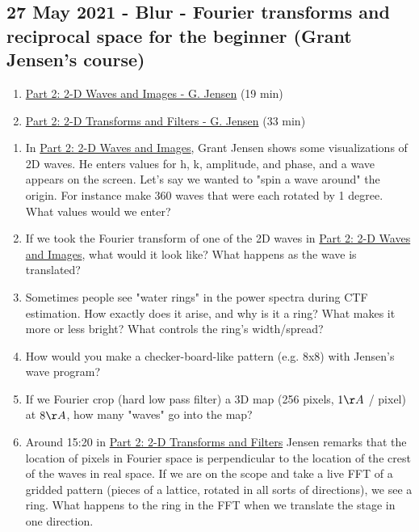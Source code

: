 \documentclass[11pt, oneside]{article}   	%
\begin{document}
\subsection{27 May 2021 - Blur - Fourier transforms and reciprocal space for the beginner (Grant Jensen's course)}
\begin{enumerate}
	\item \href{https://youtu.be/nyk75ufbP74}{Part 2: 2-D Waves and Images - G. Jensen} (19 min)
	\item \href{https://youtu.be/fEyLh9HqsWU}{Part 2: 2-D Transforms and Filters - G. Jensen} (33 min)
	\end{enumerate}
\begin{enumerate}
	\item In \href{https://youtu.be/nyk75ufbP74}{Part 2: 2-D Waves and Images}, Grant Jensen shows some visualizations of 2D waves. He enters values for h, k, amplitude, and phase, and a wave appears on the screen. Let's say we wanted to "spin a wave around" the origin. For instance make 360 waves that were each rotated by 1 degree. What values would we enter?
	\item If we took the Fourier transform of one of the 2D waves in \href{https://youtu.be/nyk75ufbP74}{Part 2: 2-D Waves and Images}, what would it look like? What happens as the wave is translated?
	\item Sometimes people see "water rings" in the power spectra during CTF estimation. How exactly does it arise, and why is it a ring? What makes it more or less bright? What controls the ring's width/spread?
	\item How would you make a checker-board-like pattern (e.g. 8x8) with Jensen's wave program?
	\item If we Fourier crop (hard low pass filter) a 3D map (256 pixels, $1 \AA$ / pixel) at $8 \AA$, how many "waves" go into the map?
	\item Around 15:20 in \href{https://youtu.be/fEyLh9HqsWU?t=920s}{Part 2: 2-D Transforms and Filters} Jensen remarks that the location of pixels in Fourier space is perpendicular to the location of the crest of the waves in real space. If we are on the scope and take a live FFT of a gridded pattern (pieces of a lattice, rotated in all sorts of directions), we see a ring. What happens to the ring in the FFT when we translate the stage in one direction.
\end{enumerate}
\end{document}
